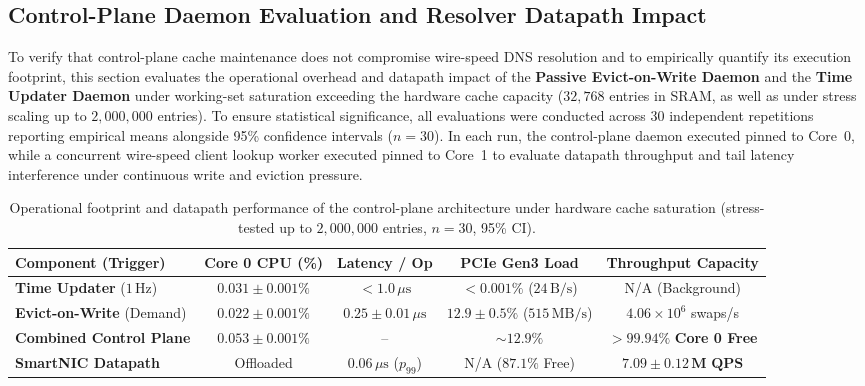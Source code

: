 \documentclass[a4paper,fleqn,colorlinks,hidelinks]{cas-sc}
\begin{document}
\subsection{Control-Plane Daemon Evaluation and Resolver Datapath Impact}
\label{sec:saturation_eval}

To verify that control-plane cache maintenance does not compromise wire-speed DNS resolution and to empirically quantify its execution footprint, this section evaluates the operational overhead and datapath impact of the \textbf{Passive Evict-on-Write Daemon} and the \textbf{Time Updater Daemon} under working-set saturation exceeding the hardware cache capacity ($32{,}768$ entries in SRAM, as well as under stress scaling up to $2{,}000{,}000$ entries). To ensure statistical significance, all evaluations were conducted across 30 independent repetitions reporting empirical means alongside 95\% confidence intervals ($n=30$). In each run, the control-plane daemon executed pinned to Core~0, while a concurrent wire-speed client lookup worker executed pinned to Core~1 to evaluate datapath throughput and tail latency interference under continuous write and eviction pressure.

\begin{table}[htbp]
\centering
\small
\caption{Operational footprint and datapath performance of the control-plane architecture under hardware cache saturation (stress-tested up to $2{,}000{,}000$ entries, $n=30$, 95\% CI).}
\label{tab:control_plane_overhead}
\begin{tabular}{@{}lcccc@{}}
\toprule
\textbf{Component (Trigger)} & \textbf{Core 0 CPU (\%)} & \textbf{Latency / Op} & \textbf{PCIe Gen3 Load} & \textbf{Throughput Capacity} \\
\midrule
\textbf{Time Updater} ($1\,\text{Hz}$) & $0.031 \pm 0.001\%$ & $< 1.0\,\mu\text{s}$ & $< 0.001\%$ ($24\,\text{B/s}$) & N/A (Background) \\
\textbf{Evict-on-Write} (Demand) & $0.022 \pm 0.001\%$ & $0.25 \pm 0.01\,\mu\text{s}$ & $12.9 \pm 0.5\%$ ($515\,\text{MB/s}$) & $4.06\times 10^6$ swaps/s \\
\midrule
\textbf{Combined Control Plane} & $\mathbf{0.053 \pm 0.001\%}$ & -- & $\mathbf{\sim 12.9\%}$ & $\mathbf{>\!99.94\%}$ \textbf{Core 0 Free} \\
\midrule
\textbf{SmartNIC Datapath} & Offloaded & $0.06\,\mu\text{s}$ ($p_{99}$) & N/A ($87.1\%$ Free) & $\mathbf{7.09 \pm 0.12\,\text{M QPS}}$ \\
\bottomrule
\end{tabular}
\end{table}
\end{document}
